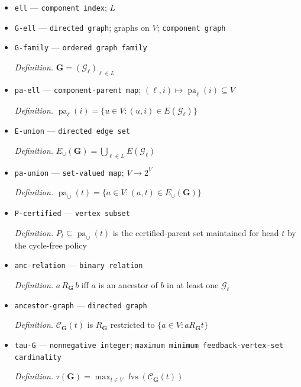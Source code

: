 \documentclass{article}
\begin{document}
\begin{itemize}
  \item \texttt{ell} --- \texttt{component index}; \(L\)
  \item \texttt{G-\allowbreak{}ell} --- \texttt{directed graph}; graphs on \(V\); \texttt{component graph}
  \item \texttt{G-\allowbreak{}family} --- \texttt{ordered graph family}
  \par\smallskip\noindent\emph{Definition.} \(\mathbf G=(\mathcal G_\ell)_{\ell\in L}\)
  \item \texttt{pa-\allowbreak{}ell} --- \texttt{component-\allowbreak{}parent map}; \((\ell,i)\mapsto\operatorname{pa}_{\ell}(i)\subseteq V\)
  \par\smallskip\noindent\emph{Definition.} \(\operatorname{pa}_{\ell}(i)=\{u\in V:(u,i)\in E(\mathcal G_\ell)\}\)
  \item \texttt{E-\allowbreak{}union} --- \texttt{directed edge set}
  \par\smallskip\noindent\emph{Definition.} \(E_{\cup}(\mathbf G)=\bigcup_{\ell\in L}E(\mathcal G_\ell)\)
  \item \texttt{pa-\allowbreak{}union} --- \texttt{set-\allowbreak{}valued map}; \(V\to 2^V\)
  \par\smallskip\noindent\emph{Definition.} \(\operatorname{pa}_{\cup}(t)=\{a\in V:(a,t)\in E_{\cup}(\mathbf G)\}\)
  \item \texttt{P-\allowbreak{}certified} --- \texttt{vertex subset}
  \par\smallskip\noindent\emph{Definition.} \(P_t\subseteq\operatorname{pa}_{\cup}(t)\) is the certified-parent set maintained for head \(t\) by the cycle-free policy
  \item \texttt{anc-\allowbreak{}relation} --- \texttt{binary relation}
  \par\smallskip\noindent\emph{Definition.} \(a\,R_{\mathbf G}\,b\) iff \(a\) is an ancestor of \(b\) in at least one \(\mathcal G_\ell\)
  \item \texttt{ancestor-\allowbreak{}graph} --- \texttt{directed graph}
  \par\smallskip\noindent\emph{Definition.} \(\mathcal C_{\mathbf G}(t)\) is \(R_{\mathbf G}\) restricted to \(\{a\in V:aR_{\mathbf G}t\}\)
  \item \texttt{tau-\allowbreak{}G} --- \texttt{nonnegative integer}; \texttt{maximum minimum feedback-\allowbreak{}vertex-\allowbreak{}set cardinality}
  \par\smallskip\noindent\emph{Definition.} \(\tau(\mathbf G)=\max_{t\in V}\operatorname{fvs}(\mathcal C_{\mathbf G}(t))\)

\end{itemize}
\end{document}
